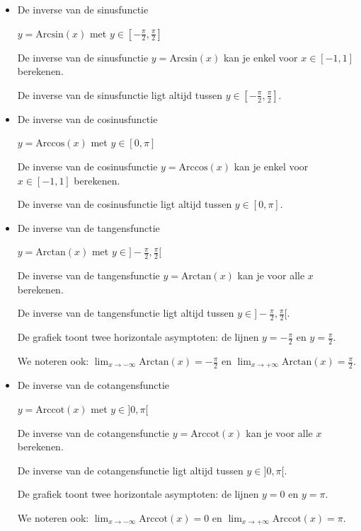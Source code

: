 \begin{itemize}
\item{De inverse van de sinusfunctie}

$y=\textrm{Arcsin}(x)$ met $y\in[-\frac{\pi}{2},\frac{\pi}{2}]$

De inverse van de sinusfunctie $y=\textrm{Arcsin}(x)$ kan je enkel
voor $x\in[-1,1]$ berekenen.

De inverse van de sinusfunctie ligt altijd tussen $y\in[-\frac{\pi}{2},\frac{\pi}{2}]$.


\begin{figure}[H]
	\centering
	
\end{figure}



\item{De inverse van de cosinusfunctie}

$y=\textrm{Arccos}(x)$ met $y\in[0,\pi]$

De inverse van de cosinusfunctie $y=\textrm{Arccos}(x)$ kan je enkel
voor $x\in[-1,1]$ berekenen.

De inverse van de cosinusfunctie ligt altijd tussen $y\in[0,\pi]$.


\item{De inverse van de tangensfunctie}

$y=\textrm{Arctan}(x)$ met $y\in]-\frac{\pi}{2},\frac{\pi}{2}[$

De inverse van de tangensfunctie $y=\textrm{Arctan}(x)$ kan je voor
alle $x$ berekenen.

De inverse van de tangensfunctie ligt altijd tussen $y\in]-\frac{\pi}{2},\frac{\pi}{2}[$.

De grafiek toont twee horizontale asymptoten: de lijnen $y=-\frac{\pi}{2}$
en $y=\frac{\pi}{2}$.

We noteren ook: $\lim_{x\to-\infty}\textrm{Arctan}(x)=-\frac{\pi}{2}$
en $\lim_{x\to+\infty}\textrm{Arctan}(x)=\frac{\pi}{2}$.


\begin{figure}[H]
\centering

\end{figure}

\item{De inverse van de cotangensfunctie}

$y=\textrm{Arccot}(x)$ met $y\in]0,\pi[$

De inverse van de cotangensfunctie $y=\textrm{Arccot}(x)$ kan je
voor alle $x$ berekenen.

De inverse van de cotangensfunctie ligt altijd tussen $y\in]0,\pi[$.

De grafiek toont twee horizontale asymptoten: de lijnen $y=0$ en
$y=\pi$.

We noteren ook: $\lim_{x\to-\infty}\textrm{Arccot}(x)=0$
en $\lim_{x\to+\infty}\textrm{Arccot}(x)=\pi$.

\end{itemize}

